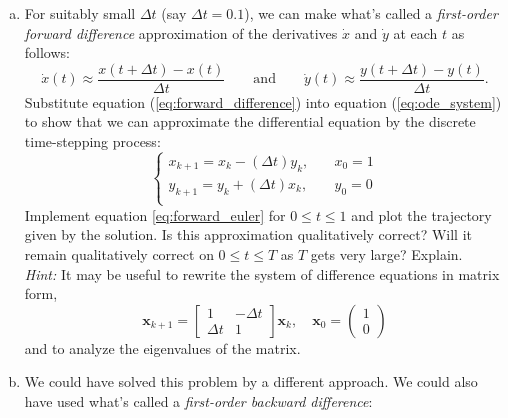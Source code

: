 \begin{enumerate}[(a)]
    \item For suitably small $\Delta t$ (say $\Delta t = 0.1$), we can make what's called a \textit{first-order forward difference} approximation of the derivatives $\dot{x}$ and $\dot{y}$ at each $t$ as follows:
    \begin{equation} 
    \label{eq:forward_difference}
    \dot{x}(t) \approx \frac{x(t + \Delta t) - x(t)}{\Delta t} \qquad \text{and} \qquad \dot{y}(t) \approx \frac{y(t + \Delta t) - y(t)}{\Delta t}.
    \end{equation}
     Substitute equation (\ref{eq:forward_difference}) into equation (\ref{eq:ode_system}) to show that we can approximate the differential equation by the discrete time-stepping process:
    \begin{equation}
    \label{eq:forward_euler}
    \begin{cases} x_{k+1} = x_k - (\Delta t) y_k, & \quad x_0 = 1\\  y_{k+1} = y_k + (\Delta t) x_k, & \quad y_0 = 0\\  \end{cases}
    \end{equation}
    Implement equation \ref{eq:forward_euler} for $0 \leq t \leq 1$ and plot the trajectory given by the solution. Is this approximation qualitatively correct? Will it remain qualitatively correct on $0 \leq t \leq T$ as $T$ gets very large? Explain.\\
    \textit{Hint:} It may be useful to rewrite the system of difference equations in matrix form,
    \begin{equation*}
    \bm{x}_{k+1} 
    = \begin{bmatrix} 1 & -\Delta t \\  \Delta t & 1\end{bmatrix} \bm{x}_k, \quad \bm{x}_0 = \begin{pmatrix} 1\\0 \end{pmatrix}
    \end{equation*}
    and to analyze the eigenvalues of the matrix.
    \item We could have solved this problem by a different approach. We could also have used what's called a \textit{first-order backward difference}:
    \begin{equation} 

\end{equation}
\end{enumerate}
